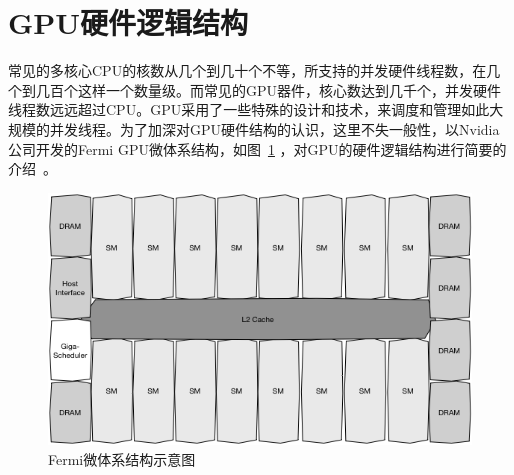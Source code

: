 \documentclass[11pt,twocolumn]{article}
\begin{document}
\renewcommand{\figurename}{图}
\section{GPU硬件逻辑结构}
常见的多核心CPU的核数从几个到几十个不等，所支持的并发硬件线程数，在几个到几百个这样一个数量级。而常见的GPU器件，核心数达到几千个，并发硬件线程数远远超过CPU。GPU采用了一些特殊的设计和技术，来调度和管理如此大规模的并发线程。为了加深对GPU硬件结构的认识，这里不失一般性，以Nvidia公司开发的Fermi GPU微体系结构，如图~\ref{fig:fermi} ，对GPU的硬件逻辑结构进行简要的介绍~\cite{Fermi}。
\begin{figure}
  \centering
    \includegraphics[scale=0.36]{images/hw-layout.png}
  \caption{Fermi微体系结构示意图}
  \label{fig:fermi}
\end{figure}
\end{document}
